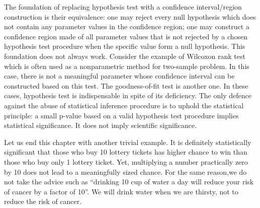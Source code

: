The foundation of replacing hypothesis test with a confidence interval/region
construction is their equivalence: one may reject every null hypothesis
which does not contain any parameter values in the confidence region; 
one may construct a confidence region made of all parameter values
that is not rejected by a chosen hypothesis test procedure when the
specific value form a null hypothesis.
This foundation does not always work.
Consider the example of Wilcoxon rank test which is often used as a 
nonparametric method for two-sample problem. 
In this case, there is not a meaningful parameter whose confidence
interval can be constructed based on this test. The goodness-of-fit test
is another one. In these cases, hypothesis test is indispensable
in spite of its deficiency. The only defence against the abuse of
statistical inference procedure is to uphold the statistical
principle: a small p-value based on a valid hypothesis test procedure implies
statistical significance. It does not imply scientific significance.

Let us end this chapter with another trivial example. It is definitely
statistically significant that those who buy 10 lottery tickets
has higher chance to win than those who buy only 1 lottery ticket.
Yet, multiplying a number practically zero by 10 does not lead to
a meaningfully sized chance. For the same reason,we do not take the
advice such as ``drinking 10 cup of water a day will reduce
your risk of cancer by a factor of 10''. We will drink water when
we are thirsty, not to reduce the risk of cancer.


